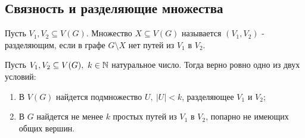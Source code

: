 \subsection{Связность и разделяющие множества}

\begin{defn}
    Пусть $V_1, V_2 \subseteq V(G)$. Множество $X \subseteq V(G)$ называется $(V_1, V_2)$ - разделяющим, если в графе $G \setminus X$ нет путей из $V_1$ в $V_2$.
\end{defn}

\begin{theorem}[Геринг, 2000]
    Пусть $V_1, V_2 \subseteq V(G),~k \in \mathbb{N}$ натуральное число. Тогда верно ровно одно из двух условий:

    \begin{enumerate}
        \item В $V(G)$ найдется подмножество $U,~|U| < k$, разделяющее $V_1$ и $V_2$;
        \item В $G$ найдется не менее $k$ простых путей из $V_1$ в $V_2$, попарно не имеющих общих вершин.
    \end{enumerate}
\end{theorem}

